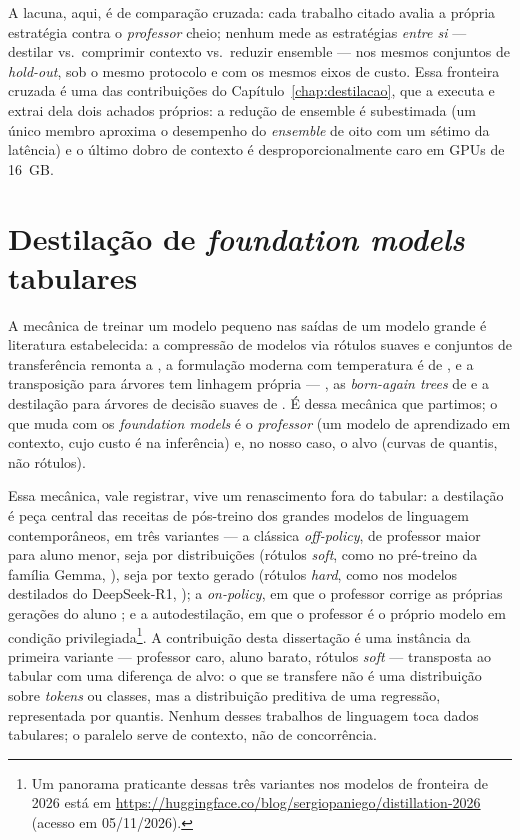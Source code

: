 A lacuna, aqui, é de comparação cruzada: cada trabalho citado avalia a própria estratégia contra
o \emph{professor} cheio; nenhum mede as estratégias \emph{entre si} ---
destilar vs.\ comprimir contexto vs.\ reduzir ensemble --- nos mesmos
conjuntos de \emph{hold-out}, sob o mesmo protocolo e com os mesmos eixos
de custo. Essa fronteira cruzada é uma das contribuições do
Capítulo~\ref{chap:destilacao}, que a executa e extrai dela dois achados
próprios: a redução de ensemble é subestimada (um único membro aproxima o desempenho do \emph{ensemble} de oito com
um sétimo da latência) e o último dobro de contexto é desproporcionalmente
caro em GPUs de 16~GB.

\section{Destilação de \emph{foundation models} tabulares}
\label{sec:rel-destilacao}

A mecânica de treinar um modelo pequeno
nas saídas de um modelo grande é literatura estabelecida: a compressão de
modelos via rótulos suaves e conjuntos de transferência remonta a
\citet{bucila2006}, a formulação moderna com temperatura é de
\citet{hinton2015}, e a transposição para árvores tem linhagem própria ---
\citet{breiman1996}, as \emph{born-again trees} de \citet{vidal2020} e a
destilação para árvores de decisão suaves de \citet{frosst2017}. É dessa
mecânica que partimos; o que muda com os \emph{foundation models} é o
\emph{professor} (um modelo de aprendizado em contexto, cujo custo é na
inferência) e, no nosso caso, o alvo (curvas de quantis, não rótulos).

Essa mecânica, vale registrar, vive um renascimento fora do tabular: a
destilação é peça central das receitas de pós-treino dos grandes
modelos de linguagem contemporâneos, em três variantes --- a clássica
\emph{off-policy}, de professor maior para aluno menor, seja por
distribuições (rótulos \emph{soft}, como no pré-treino da família
Gemma, \citealp{gemma2025}), seja por texto gerado (rótulos
\emph{hard}, como nos modelos destilados do DeepSeek-R1,
\citealp{deepseek2025}); a \emph{on-policy}, em que o professor
corrige as próprias gerações do aluno \citep{agarwal2024}; e a
autodestilação, em que o professor é o próprio modelo em condição
privilegiada\footnote{Um panorama praticante dessas três variantes nos
modelos de fronteira de 2026 está em
\url{https://huggingface.co/blog/sergiopaniego/distillation-2026}
(acesso em 05/11/2026).}. A contribuição desta dissertação é uma
instância da primeira variante --- professor caro, aluno barato,
rótulos \emph{soft} --- transposta ao tabular com uma diferença de
alvo: o que se transfere não é uma distribuição sobre \emph{tokens} ou
classes, mas a distribuição preditiva de uma regressão, representada
por quantis. Nenhum desses trabalhos de linguagem toca dados tabulares;
o paralelo serve de contexto, não de concorrência.

